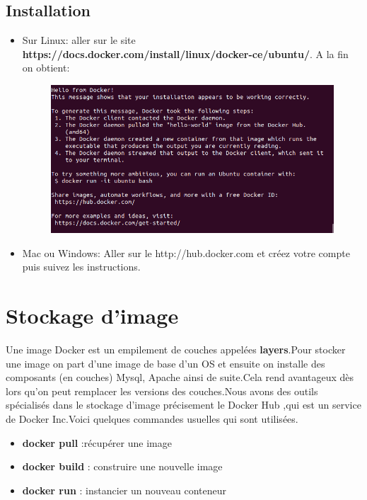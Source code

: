 \subsection*{Installation}
\begin{itemize}
	\item Sur Linux: aller sur le site \textbf{https://docs.docker.com/install/linux/docker-ce/ubuntu/}.
	\vspace{0.5cm}
	A la fin on obtient:
	\begin{figure}[!h]
		\centering\includegraphics[scale=0.5]{images/cap.png}
	\end{figure}

	\item Mac ou Windows: Aller sur le  http://hub.docker.com  et créez votre compte puis suivez les instructions.
\end{itemize}
\section*{Stockage d'image}
Une image Docker est un empilement de couches appelées \textbf{layers}.Pour stocker une image on part d’une image de base d’un OS et ensuite on installe des composants (en couches) Mysql, Apache ainsi de suite.Cela rend avantageux dès lors qu’on peut remplacer les versions des couches.Nous avons des outils spécialisés dans le stockage d'image précisement le Docker Hub ,qui est un service de Docker Inc.Voici quelques commandes usuelles qui sont utilisées.
\begin{itemize}
	\item\textbf{docker pull }:récupérer une image 
	\item\textbf{docker build }: construire une nouvelle image
	\item\textbf{docker run }: instancier un nouveau conteneur
\end{itemize}
